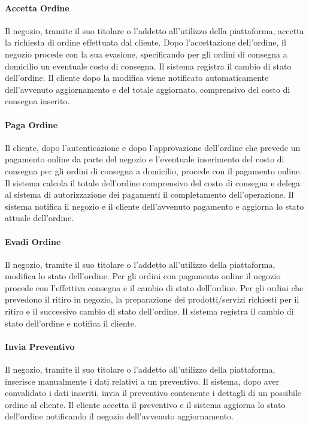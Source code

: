 \paragraph{Accetta Ordine} Il negozio, tramite il suo titolare o l'addetto all'utilizzo della piattaforma, accetta la richiesta di ordine effettuata dal cliente. Dopo l'accettazione dell'ordine, il negozio procede con la sua evasione, specificando per gli ordini di consegna a domicilio un eventuale costo di consegna. Il sistema registra il cambio di stato dell'ordine. Il cliente dopo la modifica viene notificato automaticamente dell'avvenuto aggiornamento e del totale aggiornato, comprensivo del costo di consegna inserito.
\paragraph{Paga Ordine} Il cliente, dopo l'autenticazione e dopo l'approvazione dell'ordine che prevede un pagamento online da parte del negozio e l'eventuale inserimento del costo di consegna per gli ordini di consegna a domicilio, procede con il pagamento online. Il sistema calcola il totale dell'ordine comprensivo del costo di consegna e delega al sistema di autorizzazione dei pagamenti il completamento dell'operazione. Il sistema notifica il negozio e il cliente dell'avvenuto pagamento e aggiorna lo stato attuale dell'ordine.
\paragraph{Evadi Ordine} Il negozio, tramite il suo titolare o l'addetto all'utilizzo della piattaforma, modifica lo stato dell'ordine. Per gli ordini con pagamento online il negozio procede con l'effettiva consegna e il cambio di stato dell'ordine. Per gli ordini che prevedono il ritiro in negozio, la preparazione dei prodotti/servizi richiesti per il ritiro e il successivo cambio di stato dell'ordine. Il sistema registra il cambio di stato dell'ordine e notifica il cliente.
\paragraph{Invia Preventivo} Il negozio, tramite il suo titolare o l'addetto all'utilizzo della piattaforma, inserisce manualmente i dati relativi a un preventivo. Il sistema, dopo aver convalidato i dati inseriti, invia il preventivo contenente i dettagli di un possibile ordine al cliente. Il cliente accetta il preventivo e il sistema aggiorna lo stato dell'ordine notificando il negozio dell'avvenuto aggiornamento.
